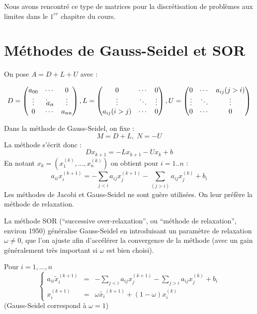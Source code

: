 Nous avons rencontré ce type de matrices pour la discrétisation de problèmes aux limites dans le $1^{er}$ chapitre du cours.

\section{Méthodes de Gauss-Seidel et SOR}

On pose $A = D + L + U$ avec :

\[
   D =
   \begin{pmatrix}
       a_{00} & \cdots                      & 0      \\ 
       \vdots & a_{ii}\hspace{-0.5cm}\ddots & \vdots \\ 
       0      & \cdots                      & a_{nn}
   \end{pmatrix} 
   , L =
   \begin{pmatrix}
        0        & \cdots & 0      \\
        \vdots   & \ddots & \vdots \\
        a_{ij}(i>j)      & \cdots & 0
   \end{pmatrix}
   , U =
   \begin{pmatrix}
        0        & \cdots & a_{ij}(j>i)     \\
        \vdots   & \ddots & \vdots \\
        0        & \cdots & 0
   \end{pmatrix}
\]

Dans la méthode de Gauss-Seidel, on fixe :
\[
    M = D+L, \; N = -U
\]
La méthode s'écrit donc :
\[
    Dx_{k+1} = -Lx_{k+1}-Ux_k + b
\]
En notant $x_k = (x^{(k)}_1,\dots,x^{(k)}_n)$ on obtient pour $i=1..n$ :
\[
    a_{ii}x^{(k+1)}_i = - \sum_{j<i}a_{ij}x_j^{(k+1)} - \sum_{(j>i)}a_{ij}x_j^{(k)} + b_i
\]
Les méthodes de Jacobi et Gauss-Seidel ne sont guère utilisées. On leur préfère la méthode de relaxation.

La méthode SOR (``successive over-relaxation'', ou ``méthode de relaxation'', environ 1950) généralise Gauss-Seidel en introduisant un paramètre de relaxation $\omega \ne 0$,
que l'on ajuste afin d'accélérer la convergence de la méthode (avec un gain généralement très important si $\omega$ est bien choisi).

Pour $i=1,\dots,n$
\begin{equation}
\left\lbrace
\begin{array}{ccc}
    a_{ii}\tilde{x}_i^{(k+1)} & = & -\sum_{j<i} a_{ij}x_j^{(k+1)} - \sum_{j>i}a_{ij}x_j^{(k)} + b_i\\
    x_i^{(k+1)} & = & \omega \tilde{x_i}^{(k+1)} + (1-\omega)x_i^{(k)}
    \label{eq:4}
\end{array}\right.
\end{equation}
(Gauss-Seidel correspond à $\omega = 1$)


